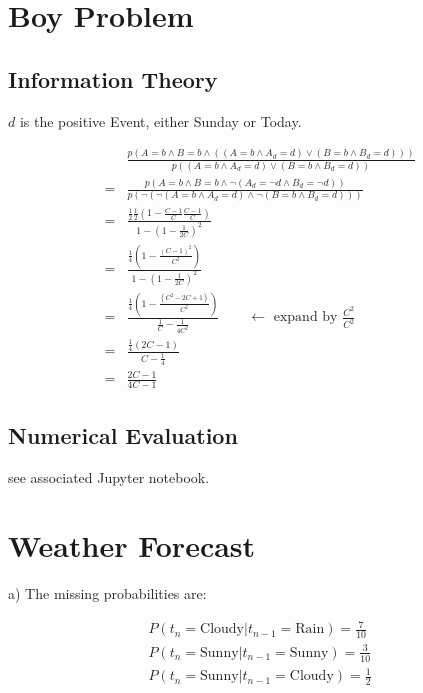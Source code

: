 \documentclass{article}
\begin{document}
	\section{Boy Problem}
	\subsection{Information Theory}
	
	$d$ is the positive Event, either Sunday or Today.
	
	\begin{align*}
	&\frac{p\left(A=b  \wedge B=b  \wedge \left(\left(A=b \wedge A_d = d\right)\vee \left(B=b \wedge B_d = d\right)\right)\right)}{p\left(\left(A=b \wedge A_d = d\right)\vee \left(B=b \wedge B_d = d\right)\right)}\\
	=&\frac{p\left(A=b  \wedge B=b  \wedge \neg\left(A_d =\neg d \wedge B_d = \neg d\right)\right)}{p\left(\neg \left(\neg\left(A=b \wedge A_d = d\right)\wedge \neg\left(B=b \wedge B_d = d\right)\right)\right)}\\
	=&\frac{\frac{1}{2}\frac{1}{2}\left(1-\frac{C-1}{C}\frac{C-1}{C}\right)}{1-\left(1-\frac{1}{2C}\right)^2}\\
	=&\frac{\frac{1}{4}\left(1-\frac{(C-1)^2}{C^2}\right)}{1-\left(1-\frac{1}{2C}\right)^2}\\
	=&\frac{\frac{1}{4}\left(1-\frac{(C^2-2C+1)}{C^2}\right)}{\frac{1}{C}-\frac{1}{4C^2}} \qquad \leftarrow\text{ expand by } \frac{C^2}{C^2} \\
	=&\frac{\frac{1}{4}(2C-1)}{C-\frac{1}{4}}\\
	=& \frac{2C-1}{4C-1}
	\end{align*}
	
	\subsection{Numerical Evaluation}
	
	see associated Jupyter notebook.
	
	\section{Weather Forecast}
	
	a) The missing probabilities are:
	
	\begin{align*}
		P(t_n = \text{Cloudy} | t_{n-1} = \text{Rain}) = \frac{7}{10} \\
		P(t_n = \text{Sunny} | t_{n-1} = \text{Sunny}) = \frac{3}{10} \\
		P(t_n = \text{Sunny} | t_{n-1} = \text{Cloudy}) = \frac{1}{2} \\
	\end{align*}
	
\end{document}
